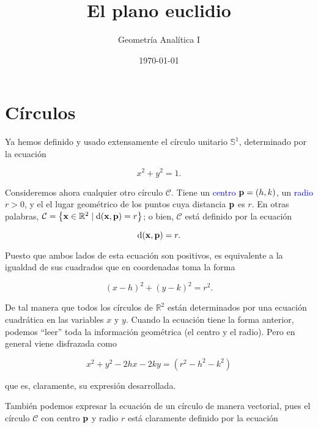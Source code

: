 \documentclass{article}
\title{\Huge{El plano euclidio}}
\author{Geometría Analítica I}
\date{\today}
\theoremstyle{definicion}
\theoremstyle{definition}             %
\theoremstyle{definition}             %
\theoremstyle{definition}
\theoremstyle{definition}
\theoremstyle{observacion}
\theoremstyle{definition}
\theoremstyle{plain}
\theoremstyle{definition}
\theoremstyle{afirmacion}
\theoremstyle{notation}
\theoremstyle{definition}
\begin{document}
    \maketitle
    
    
    \section{Círculos}

    Ya hemos definido y usado extensamente el círculo unitario \(\mathbb{S}^{1}\), determinado por la ecuación

    \begin{equation*}
        x^{2} + y^{2} = 1.
    \end{equation*}

    Consideremos ahora cualquier otro círculo \(\mathcal{C}\). Tiene un \textcolor{blue}{centro}  \(\vb{p} = (h, k)\), un \textcolor{blue}{radio} \(r > 0\), y el el lugar geométrico de los puntos cuya distancia \(\vb{p}\) es \(r\). En otras palabras, \(\mathcal{C} = \left\lbrace \vb{x} \in \mathbb{R}^{2} \mid \textrm{d}(\vb{x}, \vb{p}) = r\right\rbrace\); o bien, \(\mathcal{C}\) está definido por la ecuación

    \begin{equation*}
        \textrm{d}(\vb{x}, \vb{p}) = r.
    \end{equation*}

    Puesto que ambos lados de esta ecuación son positivos, es equivalente a la igualdad de sus cuadrados que en coordenadas toma la forma

    \begin{equation}
        (x - h)^{2} + (y - k)^{2} = r^{2}.
    \end{equation}

    De tal manera que todos los círculos de \(\mathbb{R}^{2}\) están determinados por una ecuación cuadrática en las variables \(x\) y \(y\). Cuando la ecuación tiene la forma anterior, podemos ``leer'' toda la información geométrica (el centro y el radio). Pero en general viene disfrazada como

    \begin{equation*}
        x^{2} + y^{2} -2hx - 2ky = (r^{2} - h^{2} - k^{2}) 
    \end{equation*}

    que es, claramente, su expresión desarrollada.

    También podemos expresar la ecuación de un círculo de manera vectorial, pues el círculo \(\mathcal{C}\) con centro \(\vb{p}\) y radio \(r\) está claramente definido por la ecuación
\end{document}
